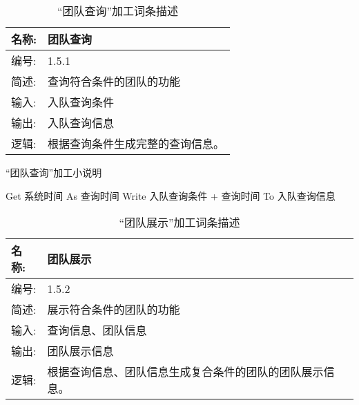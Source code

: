\begin{table}[H]  
\caption{“团队查询”加工词条描述}  
\begin{center}  
    \begin{tabular}{l p{11cm}} 
        \hline
        \quad 名称:  &  团队查询 \\
        \hline
        \quad 编号:  & 1.5.1 \\
        \hline
        \quad 简述:  & 查询符合条件的团队的功能 \\
        \hline
        \quad 输入:  & 入队查询条件 \\
        \hline
        \quad 输出:  & 入队查询信息\\
        \hline
        \quad 逻辑:  & 根据查询条件生成完整的查询信息。 \\
        \hline
    \end{tabular}
    \label{tab1}
\end{center}
\end{table}

\begin{algorithm}[H] 
    \renewcommand{\thealgorithm}{}
    \caption{“团队查询”加工小说明} 
    \label{alg3} 
    \begin{algorithmic}[1]
        \STATE Get 系统时间 As 查询时间
        \STATE Write 入队查询条件 + 查询时间 To 入队查询信息 
    \end{algorithmic} 
\end{algorithm}


\begin{table}[H]  
\caption{“团队展示”加工词条描述}  
\begin{center}  
    \begin{tabular}{l p{11cm}} 
        \hline
        \quad 名称:  &   团队展示 \\
        \hline
        \quad 编号:  & 1.5.2 \\
        \hline
        \quad 简述:  & 展示符合条件的团队的功能 \\
        \hline
        \quad 输入:  & 查询信息、团队信息 \\
        \hline
        \quad 输出:  & 团队展示信息\\
        \hline
        \quad 逻辑:  & 根据查询信息、团队信息生成复合条件的团队的团队展示信息。 \\
        \hline
    \end{tabular}
    \label{tab1}
\end{center}
\end{table}

